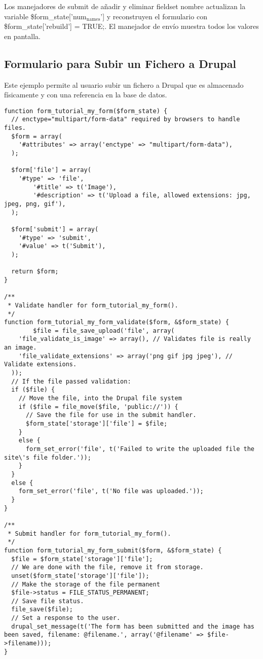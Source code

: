 \documentclass[11pt]{article}
\begin{document}
Los manejadores de submit de añadir y eliminar fieldset nombre
actualizan la variable \$form\_state['num$_{\mathrm{names}}$'] y reconstruyen el
formulario con \$form\_state['rebuild'] = TRUE;. El manejador de envío
muestra todos los valores en pantalla.


\subsection{Formulario para Subir un Fichero a Drupal}
\label{sec-4.12}


Este ejemplo permite al usuario subir un fichero a Drupal que es
almacenado físicamente y con una referencia en la base de datos.


\begin{verbatim}
function form_tutorial_my_form($form_state) {
  // enctype="multipart/form-data" required by browsers to handle files.
  $form = array(
    '#attributes' => array('enctype' => "multipart/form-data"),
  );

  $form['file'] = array(
    '#type' => 'file',
        '#title' => t('Image'),
        '#description' => t('Upload a file, allowed extensions: jpg, jpeg, png, gif'),
  );

  $form['submit'] = array(
    '#type' => 'submit',
    '#value' => t('Submit'),
  );

  return $form;
}

/**
 * Validate handler for form_tutorial_my_form().
 */
function form_tutorial_my_form_validate($form, &$form_state) {
        $file = file_save_upload('file', array(
    'file_validate_is_image' => array(), // Validates file is really an image.
    'file_validate_extensions' => array('png gif jpg jpeg'), // Validate extensions.
  ));
  // If the file passed validation:
  if ($file) {
    // Move the file, into the Drupal file system
    if ($file = file_move($file, 'public://')) {
      // Save the file for use in the submit handler.
      $form_state['storage']['file'] = $file;
    }
    else {
      form_set_error('file', t('Failed to write the uploaded file the site\'s file folder.'));
    }
  }
  else {
    form_set_error('file', t('No file was uploaded.'));
  }
}

/**
 * Submit handler for form_tutorial_my_form().
 */
function form_tutorial_my_form_submit($form, &$form_state) {
  $file = $form_state['storage']['file'];
  // We are done with the file, remove it from storage.
  unset($form_state['storage']['file']);
  // Make the storage of the file permanent
  $file->status = FILE_STATUS_PERMANENT;
  // Save file status.
  file_save($file);
  // Set a response to the user.
  drupal_set_message(t('The form has been submitted and the image has been saved, filename: @filename.', array('@filename' => $file->filename)));
}
\end{verbatim}
\end{document}
